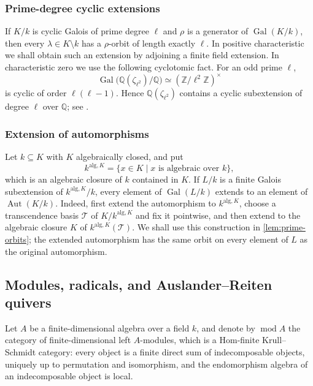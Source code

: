 \documentclass[11pt,letterpaper,reqno]{amsart}
\theoremstyle{definition}
\DeclareMathOperator{\Aut}{Aut}
\DeclareMathOperator{\Gal}{Gal}
\newcommand{\modcat}{\operatorname{mod}}
\begin{document}
\subsubsection{Prime-degree cyclic extensions}\label{Prime-degree cyclic extensions}
If $K/k$ is cyclic Galois of prime degree $\ell$ and $\rho$ is a generator
of $\Gal(K/k)$, then every $\lambda\in K\setminus k$ has a $\rho$-orbit of
length exactly $\ell$.  In positive characteristic we shall obtain such an
extension by adjoining a finite field extension.  In characteristic zero we
use the following cyclotomic fact.  For an odd prime $\ell$,
$$
\Gal\bigl(\mathbb Q(\zeta_{\ell^2})/\mathbb Q\bigr)
\simeq (\mathbb Z/\ell^2\mathbb Z)^\times
$$
is cyclic of order $\ell(\ell-1)$.  Hence
$\mathbb Q(\zeta_{\ell^2})$ contains a cyclic subextension of degree
$\ell$ over $\mathbb Q$; see \cite[Chapter~2]{Washington}.



\subsubsection{Extension of automorphisms}
Let $k\subseteq K$ with $K$ algebraically closed, and put
\[
k^{\mathrm{alg},K}
 =\{x\in K\mid x\text{ is algebraic over }k\},
\]
which is an algebraic closure of $k$ contained in $K$.  If $L/k$ is a finite
Galois subextension of $k^{\mathrm{alg},K}/k$, every element of
$\Gal(L/k)$ extends to an element of $\Aut(K/k)$.  Indeed, first extend the
automorphism to $k^{\mathrm{alg},K}$, choose a transcendence basis
$\mathcal T$ of $K/k^{\mathrm{alg},K}$ and fix it pointwise, and then extend
to the algebraic closure $K$ of $k^{\mathrm{alg},K}(\mathcal T)$.  We shall
use this construction in \cref{lem:prime-orbits}; the extended automorphism
has the same orbit on every element of $L$ as the original automorphism.



\subsection{Modules, radicals, and Auslander--Reiten quivers}
\label{subsec:representation-preliminaries}

Let $A$ be a finite-dimensional algebra over a field $k$, and denote by
$\modcat A$ the category of finite-dimensional left $A$-modules, which is a Hom-finite Krull--Schmidt category: every object is a finite
direct sum of indecomposable objects, uniquely up to permutation and
isomorphism, and the endomorphism algebra of an indecomposable object is
local.
\end{document}
